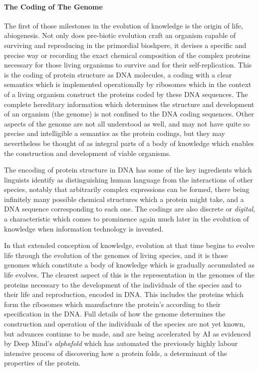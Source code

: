 \documentclass[10pt,titlepage]{book}
\begin{document}
\paragraph{The Coding of The Genome}
The first of those milestones in the evolution of knowledge is the origin of life, abiogenesis.
Not only does pre-biotic evolution craft an organism capable of surviving and reproducing in the primordial bioshpere, it devises a specific and precise way or recording the exact chemical composition of the complex proteins necessary for those living organisms to survive and for their self-replication.
This is the coding of protein structure as DNA molecules, a coding with a clear semantics which is implemented operationally by ribosomes which in the context of a living organism construct the proteins coded by these DNA sequences.
The complete hereditary information which determines the structure and development of an organism (the genome) is not confined to the DNA coding sequences.
Other aspects of the genome are not all understood as well, and may not have quite so precise and intelligible a semantics as the protein codings, but they may nevertheless be thought of as integral parts of a body of knowledge which enables the construction and development of viable organisms.

The encoding of protein structure in DNA has some of the key ingredients which linguists identify as distinguishing human language from the interactions of other species, notably that arbitrarily complex expressions can be formed, there being infinitely many possible chemical structures which a protein might take, and a DNA sequence corresponding to each one.
The codings are also discrete or \emph{digital}, a characteristic which comes to prominence again much later in the evolution of knowledge when information technology is invented.

In that extended conception of knowledge, evolution at that time begins to evolve life through the evolution of the genomes of living species, and it is those genomes which constitute a body of knowledge which is gradually accumulated as life evolves.
The clearest aspect of this is the representation in the genomes of the proteins necessary to the development of the individuals of the species and to their life and reproduction, encoded in DNA.
This includes the proteins which form the ribosomes which manufacture the protein's according to their specification in the DNA.
Full details of how the genome determines the construction and operation of the individuals of the species are not yet known, but advances continue to be made, and are being accelerated by AI as evidenced by Deep Mind's \emph{alphafold} which has automated the previously highly labour intensive process of discovering how a protein folds, a determinant of the properties of the protein.
\end{document}
